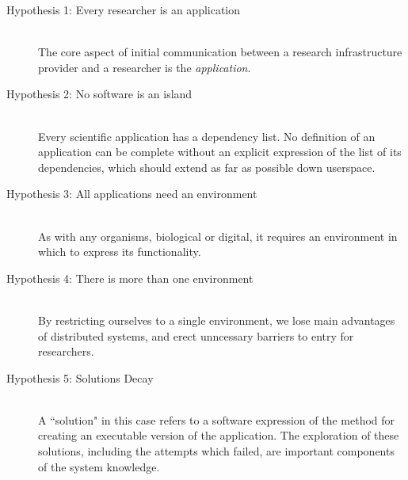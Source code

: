 \documentclass[a4paper]{jpconf}
\begin{document}
	\begin{description}
		\item[Hypothesis 1: Every researcher is an application] \hfill \\
        The core aspect of initial communication between a research infrastructure provider and a
            researcher is the {\it application}. %
		\item[Hypothesis 2: No software is an island] \hfill \\
        Every scientific application has a dependency list. No definition of an application can be
            complete without an explicit expression of the list of its dependencies, which should
            extend as far as possible down userspace.
		\item[Hypothesis 3: All applications need an environment] \hfill \\
        As with any organisms, biological or digital, it requires an environment in which to 
            express its functionality.%
		\item[Hypothesis 4: There is more than one environment] \hfill \\
        By restricting ourselves to a single environment, we lose main advantages of distributed
            systems, and erect unncessary barriers to entry for researchers. %
		\item[Hypothesis 5: Solutions Decay] \hfill \\
        A ``solution" in this case refers to a software expression of the method for creating an
            executable version of the application. The exploration of these solutions, including the
            attempts which failed, are important components of the system knowledge. %

\end{description}
\end{document}
